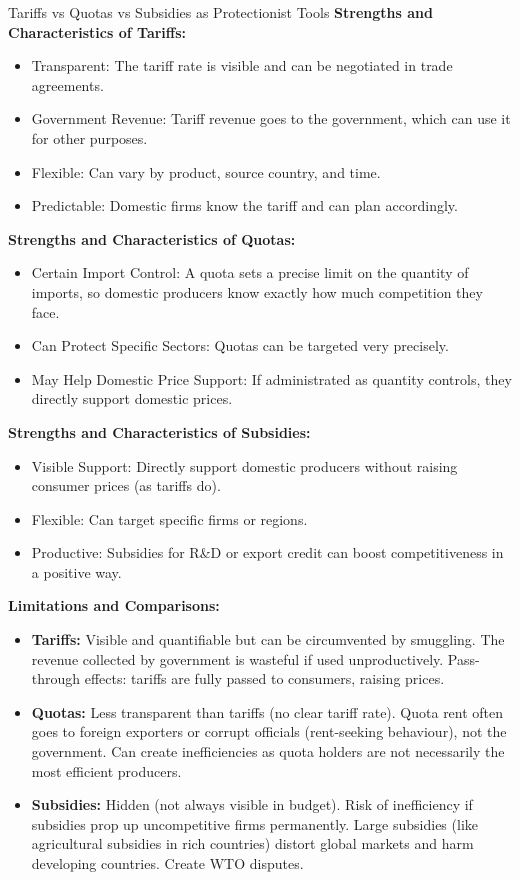 \documentclass[11pt, a4paper, twoside]{book}
\begin{document}
\begin{evaluation}{Tariffs vs Quotas vs Subsidies as Protectionist Tools}
\textbf{Strengths and Characteristics of Tariffs:}
\begin{itemize}
  \item Transparent: The tariff rate is visible and can be negotiated in trade agreements.
  \item Government Revenue: Tariff revenue goes to the government, which can use it for other purposes.
  \item Flexible: Can vary by product, source country, and time.
  \item Predictable: Domestic firms know the tariff and can plan accordingly.
\end{itemize}

\textbf{Strengths and Characteristics of Quotas:}
\begin{itemize}
  \item Certain Import Control: A quota sets a precise limit on the quantity of imports, so domestic producers know exactly how much competition they face.
  \item Can Protect Specific Sectors: Quotas can be targeted very precisely.
  \item May Help Domestic Price Support: If administrated as quantity controls, they directly support domestic prices.
\end{itemize}

\textbf{Strengths and Characteristics of Subsidies:}
\begin{itemize}
  \item Visible Support: Directly support domestic producers without raising consumer prices (as tariffs do).
  \item Flexible: Can target specific firms or regions.
  \item Productive: Subsidies for R\&D or export credit can boost competitiveness in a positive way.
\end{itemize}

\textbf{Limitations and Comparisons:}
\begin{itemize}
  \item \textbf{Tariffs:} Visible and quantifiable but can be circumvented by smuggling. The revenue collected by government is wasteful if used unproductively. Pass-through effects: tariffs are fully passed to consumers, raising prices.
  \item \textbf{Quotas:} Less transparent than tariffs (no clear tariff rate). Quota rent often goes to foreign exporters or corrupt officials (rent-seeking behaviour), not the government. Can create inefficiencies as quota holders are not necessarily the most efficient producers.
  \item \textbf{Subsidies:} Hidden (not always visible in budget). Risk of inefficiency if subsidies prop up uncompetitive firms permanently. Large subsidies (like agricultural subsidies in rich countries) distort global markets and harm developing countries. Create WTO disputes.
\end{itemize}


\end{evaluation}
\end{document}
